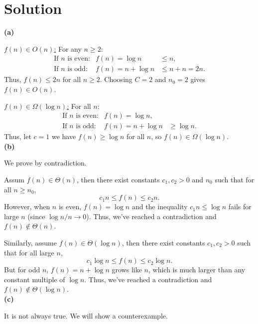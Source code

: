 \documentclass[11pt]{article}
\begin{document}
    \section*{Solution}
    \textbf{(a)}

    \underline{\(f(n)\in O(n)\):}  
    For any \(n\ge 2\):
    \[
    \begin{array}{rcl}
    \text{If } n \text{ is even:} & f(n)= \log n &\le n,\\[1mm]
    \text{If } n \text{ is odd:} & f(n)= n+\log n &\le n+n = 2n.
    \end{array}
    \]
    Thus, \(f(n)\le 2n\) for all \(n\ge 2\). Choosing \(C=2\) and \(n_0=2\) gives \(f(n)\in O(n)\).

    \underline{\(f(n)\in \Omega(\log n)\):}  
    For all \(n\):
    \[
    \begin{array}{rcl}
    \text{If } n \text{ is even:} & f(n)= \log n,\\[1mm]
    \text{If } n \text{ is odd:} & f(n)= n+\log n &\ge \log n.
    \end{array}
    \]
    Thus, let \(c=1\) we have \(f(n)\ge \log n\) for all \(n\), so \(f(n)\in \Omega(\log n)\).
    \\
    \textbf{(b)}

    We prove by contradiction.
    
    Assum \(f(n)\in \Theta(n)\), then there exist constants \(c_1, c_2>0\) and \(n_0\) such that for all \(n\ge n_0\),
    \[
    c_1 n \le f(n) \le c_2 n.
    \]
    However, when \(n\) is even, \(f(n)=\log n\) and the inequality \(c_1 n \le \log n\) fails for large \(n\) (since \(\log n/n\to 0\)). Thus, we've reached a contradiction and \(f(n)\notin \Theta(n)\).

    Similarly, assume \(f(n)\in \Theta(\log n)\), then there exist constants \(c_1, c_2>0\) such that for all large \(n\),
    \[
    c_1 \log n \le f(n) \le c_2 \log n.
    \]
    But for odd \(n\), \(f(n)= n+\log n\) grows like \(n\), which is much larger than any constant multiple of \(\log n\). Thus, we've reached a contradiction and \(f(n)\notin \Theta(\log n)\).
    \\
    \textbf{(c)}

    It is not always true. We will show a counterexample.
\end{document}

